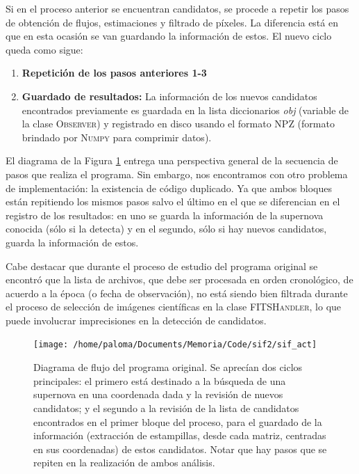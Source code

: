 Si en el proceso anterior se encuentran candidatos, se procede a repetir los pasos de obtenci\'on de flujos, estimaciones y filtrado de p\'ixeles. La diferencia est\'a en que en esta ocasi\'on se van guardando la informaci\'on de estos. El nuevo ciclo queda como sigue:

\begin{enumerate}

\item \textbf{Repetici\'on de los pasos anteriores 1-3}
\item \textbf{Guardado de resultados:} La informaci\'on de los nuevos candidatos encontrados previamente es guardada en la lista diccionarios \textit{obj} (variable de la clase \textsc{Observer}) y registrado en disco usando el formato NPZ (formato brindado por \textsc{Numpy} para comprimir datos).
\end{enumerate}


El diagrama de la Figura \ref{fig:des_sif} entrega una perspectiva general de la secuencia de pasos que realiza el programa. Sin embargo, nos encontramos con otro problema de implementaci\'on: la existencia de c\'odigo duplicado. Ya que ambos bloques est\'an repitiendo los mismos pasos salvo el \'ultimo en el que se diferencian en el registro de los resultados: en uno se guarda la informaci\'on de la supernova conocida (s\'olo si la detecta) y en el segundo, s\'olo si hay nuevos candidatos, guarda la informaci\'on de estos.
\bigskip

Cabe destacar que durante el proceso de estudio del programa original se encontr\'o que la lista de archivos, que debe ser procesada en orden cronol\'ogico, de acuerdo a la \'epoca (o fecha de observaci\'on), no est\'a siendo bien filtrada durante el proceso de selecci\'on de im\'agenes cient\'ificas en la clase \textsc{FITSHandler}, lo que puede involucrar imprecisiones en la detecci\'on de candidatos.
\bigskip


\begin{figure}[h!]
\centering
\texttt{[image: /home/paloma/Documents/Memoria/Code/sif2/sif\_act]}
\caption{Diagrama de flujo del programa original. Se aprec\'ian dos ciclos principales: el primero est\'a destinado a la b\'usqueda de una supernova en una coordenada dada y la revisi\'on de nuevos candidatos; y el segundo a la revisi\'on de la lista de candidatos encontrados en el primer bloque del proceso, para el guardado de la informaci\'on (extracci\'on de estampillas, desde cada matriz, centradas en sus coordenadas) de estos candidatos. Notar que hay pasos que se repiten en la realizaci\'on de ambos an\'alisis.}
\label{fig:des_sif}
\end{figure}

